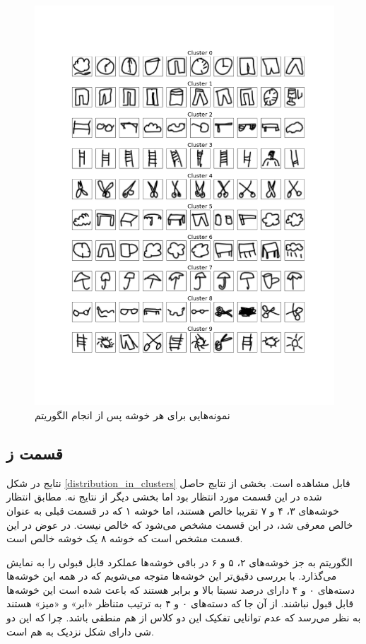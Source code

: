 \documentclass[12pt, a4paper]{article}
\begin{document}
\begin{figure}[h]
    \centering
    \includegraphics[width=0.85\linewidth]{images/q4/f/samples.png}
    \caption{نمونه‌هایی برای هر خوشه پس از انجام الگوریتم }
    \label{samples_for_each_cluster}
\end{figure}

\clearpage

\subsection*{قسمت ز}

نتایج در شکل \ref{distribution_in_clusters} قابل مشاهده است. بخشی از نتایج
حاصل شده در این قسمت مورد انتظار بود اما بخشی دیگر از نتایج نه. مطابق انتظار
خوشه‌های ۳، ۴ و ۷ تقریبا خالص هستند، اما خوشه ۱ که در قسمت قبلی به عنوان خالص
معرفی شد، در این قسمت مشخص می‌شود که خالص نیست. در عوض در این قسمت مشخص
است که خوشه ۸ یک خوشه خالص است.

الگوریتم به جز خوشه‌های ۲، ۵ و ۶ در باقی خوشه‌ها عملکرد قابل قبولی را به نمایش
می‌گذارد. با بررسی دقیق‌تر این خوشه‌ها متوجه می‌شویم که در همه این خوشه‌ها
دسته‌های ۰ و ۴ دارای درصد نسبتا بالا و برابر هستند که باعث شده است این خوشه‌ها
قابل قبول نباشند. از آن جا که دسته‌های ۰ و ۴ به ترتیب متناظر «ابر» و «میز»
هستند به نظر می‌رسد که عدم توانایی تفکیک این دو کلاس از هم منطقی باشد. چرا که
این دو شی دارای شکل نزدیک به هم است.
\end{document}
